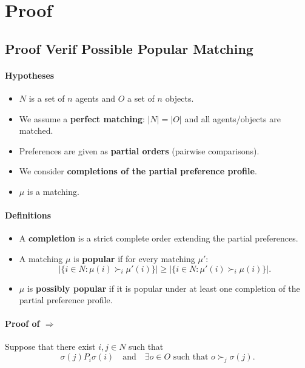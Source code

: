 \documentclass{article}
\begin{document}
\pagebreak


\section{Proof}

\subsection{Proof Verif Possible Popular Matching}

\paragraph{Hypotheses}
\begin{itemize}
    \item $N$ is a set of $n$ agents and $O$ a set of $n$ objects.
    \item We assume a \textbf{perfect matching}: $|N| = |O|$ and all agents/objects are matched.
    \item Preferences are given as \textbf{partial orders} (pairwise comparisons).
    \item We consider \textbf{completions of the partial preference profile}.
    \item $\mu$ is a matching.
\end{itemize}

\paragraph{Definitions}

\begin{itemize}
    \item A \textbf{completion} is a strict complete order extending the partial preferences.
    \item A matching $\mu$ is \textbf{popular} if for every matching $\mu'$:
    \[
    |\{i \in N : \mu(i) \succ_i \mu'(i)\}| \ge |\{i \in N : \mu'(i) \succ_i \mu(i)\}|.
    \]
    \item $\mu$ is \textbf{possibly popular} if it is popular under at least one completion of the partial preference profile.
\end{itemize}


\paragraph{Proof of $\Rightarrow$}

Suppose that there exist $i,j \in N$ such that
\[
\sigma(j) P_i \sigma(i)
\quad \text{and} \quad
\exists o \in O \text{ such that } o \succ_j \sigma(j).
\]
\end{document}
